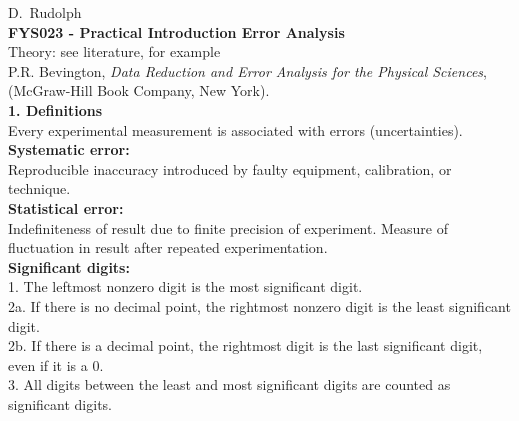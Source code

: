 \documentclass[12pt]{article}
\begin{document}
\renewcommand{\rmdefault}{phv}
\renewcommand{\sup}[1]{$^{\footnotesize\textsl{#1}}$}
\newcommand{\su}[1]{$^{\footnotesize\textrm{#1}}$}
\renewcommand{\sb}[1]{$_{\footnotesize\textrm{#1}}$}
\newcommand{\sss}[2]{$^{\footnotesize\textsl{#1}}_{\footnotesize\textsl{#2}}$}
\newcommand{\susu}[2]{$^{\footnotesize\textrm{#1}}_{\footnotesize\textrm{#2}}$}
\newcommand{\WB}{{\bf WB}\\}

\normalsize\vspace*{-1cm}

D.~Rudolph\\

{\Large\bf FYS023 - Practical Introduction Error Analysis}\\
Theory: see literature, for example\\
{\small P.R. Bevington, {\it Data Reduction and Error Analysis
for the Physical Sciences},\\ (McGraw-Hill Book Company, New York).}\\

{\large\bf 1. Definitions}\\
Every experimental measurement is associated with errors (uncertainties).\\
{\bf Systematic error:}\\
Reproducible inaccuracy introduced by faulty
equipment, calibration, or technique.\\ %
{\bf Statistical error:}\\
Indefiniteness of result due to finite precision
of experiment. Measure of fluctuation in result after repeated
experimentation.\\ %
{\bf Significant digits:}\\
\hspace*{1em}1. The leftmost nonzero digit is the most significant digit.\\
\hspace*{1em}2a. If there is no decimal point, the rightmost nonzero digit
is the least significant \hspace*{2em}digit.\\
\hspace*{1em}2b. If there is a decimal point, the rightmost digit
is the last significant digit,\\ \hspace*{2em}even if it is a 0.\\
\hspace*{1em}3. All digits between the least and most significant digits
are counted as significant \hspace*{2em}digits.\\
\end{document}
